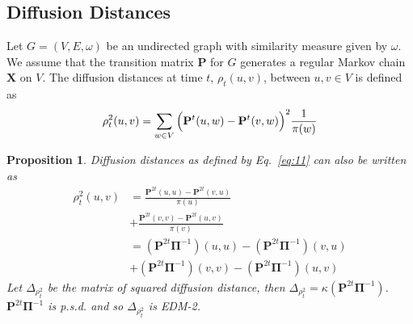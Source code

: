 \documentclass[10pt,twocolumn]{article}
\newtheorem{proposition}[theorem]{Proposition}
\numberwithin{equation}{section}
\begin{document}
\subsection{Diffusion Distances}
\label{sec:diffusion-distances}
Let $G = (V,E,\omega)$ be an undirected graph with similarity measure
given by $\omega$. We assume that the transition matrix $\mathbf{P}$
for $G$ generates a regular Markov chain $\mathbf{X}$ on $V$. The
diffusion distances at time $t$, $\rho_{t}(u,v)$, between $u,v \in V$
is defined as \cite{coifman06:_diffus_maps}
\begin{equation}
  \label{eq:11}
  \rho^{2}_{t}(u,v) = \sum_{w \in V}{\Bigl(\mathbf{P}^{t}(u,w) -
      \mathbf{P}^{t}(v,w)\Bigr)^2 \frac{1}{\pi(w)}}
\end{equation}
\begin{proposition}
  \label{prop:6}
  Diffusion distances as defined by Eq.~\eqref{eq:11} can also be
  written as
  \begin{equation*}
    \begin{split}
      \rho_{t}^{2}(u,v) &= \frac{\mathbf{P}^{2t}(u,u) -
        \mathbf{P}^{2t}(v,u)}{\pi(u)} \\ &+
      \frac{\mathbf{P}^{2t}(v,v) -
        \mathbf{P}^{2t}(u,v)}{\pi(v)}  \\
      &= (\mathbf{P}^{2t}\bm{\Pi}^{-1})(u,u) -
      (\mathbf{P}^{2t}\bm{\Pi}^{-1})(v,u) \\
      &+ (\mathbf{P}^{2t}\bm{\Pi}^{-1})(v,v) -
      (\mathbf{P}^{2t}\bm{\Pi}^{-1})(u,v)
    \end{split}
  \end{equation*}
  Let $\Delta_{\rho_t^2}$ be the matrix of squared diffusion distance,
  then $\Delta_{\rho_t^2} =
  \kappa(\mathbf{P}^{2t}\bm{\Pi}^{-1})$. 
  $\mathbf{P}^{2t}\bm{\Pi}^{-1}$ is p.s.d. and so
  $\Delta_{\rho_{t}^2}$ is EDM-2.
\end{proposition}
\end{document}
